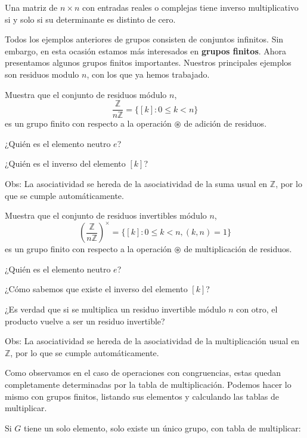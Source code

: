 \begin{proposicion}
Una matriz de $n\times n$ con entradas reales o complejas tiene inverso multiplicativo si y solo si su determinante es distinto de cero.  
\end{proposicion}

Todos los ejemplos anteriores de grupos consisten de conjuntos infinitos. Sin embargo, en esta ocasión estamos más interesados en {\bf grupos finitos}. Ahora presentamos algunos grupos finitos importantes. Nuestros principales ejemplos son residuos modulo $n$, con los que ya hemos trabajado.

\begin{ejercicio}
Muestra que el conjunto de residuos módulo $n$, $$\frac{\mathbb Z}{n \mathbb Z}=\{[k]:0\leq  k< n\}$$ es un grupo finito con respecto a la operación $\circledast$ de adición de residuos. 

¿Quién es el elemento neutro $e$?

¿Quién es el inverso del elemento $[k]$?

\end{ejercicio}
Obs: La asociatividad se hereda de la asociatividad de la suma usual en $\mathbb Z$, por lo que se cumple automáticamente.  

\begin{ejercicio}
Muestra que el conjunto de residuos invertibles módulo $n$, $$\left(\frac{\mathbb Z}{n \mathbb Z}\right)^{\times}=\{[k]: 0\leq k< n, (k,n)=1\}$$ es un grupo finito con respecto a la operación $\circledast$ de multiplicación de residuos. 

¿Quién es el elemento neutro $e$?

¿Cómo sabemos que existe el inverso del elemento $[k]$?

¿Es verdad que si se multiplica un residuo invertible módulo $n$ con otro, el producto vuelve a ser un residuo invertible?

\end{ejercicio}
Obs: La asociatividad se hereda de la asociatividad de la multiplicación usual en $\mathbb Z$, por lo que se cumple automáticamente.

Como observamos en el caso de operaciones con congruencias, estas quedan completamente determinadas por la tabla de multiplicación. Podemos hacer lo mismo con grupos finitos, listando sus elementos y calculando las tablas de multiplicar.

Si $G$ tiene un solo elemento, solo existe un único grupo, con tabla de multiplicar:

